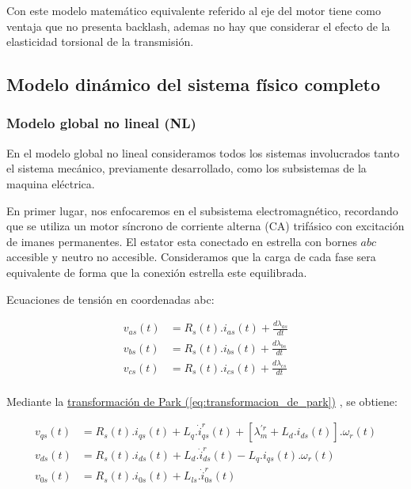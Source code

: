 \documentclass{article}
\begin{document}
Con este modelo matemático equivalente referido al eje del motor tiene como 
ventaja que no presenta backlash, ademas no hay que considerar el efecto de 
la elasticidad torsional de la transmisión.


\subsection{Modelo dinámico del sistema físico completo}


\subsubsection{Modelo global no lineal (NL)}

En el modelo global no lineal consideramos todos los sistemas involucrados 
tanto el sistema mecánico, previamente desarrollado, como los subsistemas de la maquina eléctrica.

En primer lugar, nos enfocaremos en el subsistema electromagnético, recordando que 
se utiliza un motor síncrono de corriente alterna (CA) trifásico con excitación de imanes 
permanentes. El estator esta conectado en estrella con bornes $abc$ accesible y neutro no accesible.
Consideramos que la carga de cada fase sera equivalente de forma que la conexión estrella este equilibrada.

Ecuaciones de tensión en coordenadas abc:

\begin{equation}\label{eq.tensiones_abc}
    \begin{aligned}
        v_{as}(t) &= R_{s}(t).i_{as}(t) + \frac{d\lambda_{as}}{dt}\\
        v_{bs}(t) &= R_{s}(t).i_{bs}(t) + \frac{d\lambda_{bs}}{dt}\\
        v_{cs}(t) &= R_{s}(t).i_{cs}(t) + \frac{d\lambda_{cs}}{dt}\\
    \end{aligned}
\end{equation}

Mediante la
\hyperref[eq:transformacion_de_park]{transformación de Park (\ref*{eq:transformacion_de_park})}
, se obtiene:

\begin{equation}\label{eq.tensiones_qd0}
    \begin{aligned}
        v_{qs}(t) &= R_{s}(t).i_{qs}(t) + L_{q}.\dot{i}_{qs}^r(t) + [\lambda_{m}^{\prime r} + L_{d}.i_{ds}(t)].\omega_{r}(t)\\
        v_{ds}(t) &= R_{s}(t).i_{ds}(t) + L_{d}.\dot{i}_{ds}^r(t)  - L_{q}.i_{qs}(t).\omega_{r}(t)\\
        v_{0s}(t) &= R_{s}(t).i_{0s}(t) + L_{ls}.\dot{i}_{0s}^r(t)
    \end{aligned}
\end{equation}
\end{document}

